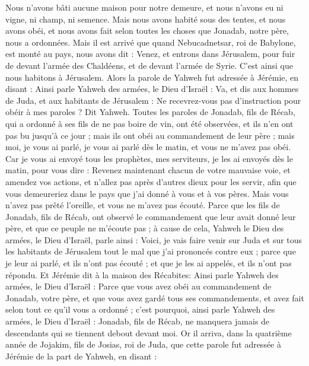 \begin{multicols}{2}
Nous n'avons bâti aucune maison pour notre demeure, et nous n'avons eu ni vigne, ni champ, ni semence.
Mais nous avons habité sous des tentes, et nous avons obéi, et nous avons fait selon toutes les choses que Jonadab, notre père, nous a ordonnées.
Mais il est arrivé que quand Nebucadnetsar, roi de Babylone, est monté au pays, nous avons dit : Venez, et entrons dans Jérusalem, pour fuir de devant l'armée des Chaldéens, et de devant l'armée de Syrie. C'est ainsi que nous habitons à Jérusalem.
Alors la parole de Yahweh fut adressée à Jérémie, en disant :
Ainsi parle Yahweh des armées, le Dieu d'Israël : Va, et dis aux hommes de Juda, et aux habitants de Jérusalem : Ne recevrez-vous pas d'instruction pour obéir à mes paroles ? Dit Yahweh.
Toutes les paroles de Jonadab, fils de Récab, qui a ordonné à ses fils de ne pas boire de vin, ont été observées, et ils n'en ont pas bu jusqu'à ce jour ; mais ils ont obéi au commandement de leur père ; mais moi, je vous ai parlé, je vous ai parlé dès le matin, et vous ne m'avez pas obéi.
Car je vous ai envoyé tous les prophètes, mes serviteurs, je les ai envoyés dès le matin, pour vous dire : Revenez maintenant chacun de votre mauvaise voie, et amendez vos actions, et n'allez pas après d'autres dieux pour les servir, afin que vous demeureriez dans le pays que j'ai donné à vous et à vos pères. Mais vous n'avez pas prêté l'oreille, et vous ne m'avez pas écouté.
Parce que les fils de Jonadab, fils de Récab, ont observé le commandement que leur avait donné leur père, et que ce peuple ne m'écoute pas ;
à cause de cela, Yahweh le Dieu des armées, le Dieu d'Israël, parle ainsi : Voici, je vais faire venir sur Juda et sur tous les habitants de Jérusalem tout le mal que j'ai prononcés contre eux ; parce que je leur ai parlé, et ils n'ont pas écouté ; et que je les ai appelés, et ils n'ont pas répondu.
Et Jérémie dit à la maison des Récabites: Ainsi parle Yahweh des armées, le Dieu d'Israël : Parce que vous avez obéi au commandement de Jonadab, votre père, et que vous avez gardé tous ses commandements, et avez fait selon tout ce qu'il vous a ordonné ;
c'est pourquoi, ainsi parle Yahweh des armées, le Dieu d'Israël : Jonadab, fils de Récab, ne manquera jamais de descendants qui se tiennent debout devant moi.
\VerseOne{}Or il arriva, dans la quatrième année de Jojakim, fils de Josias, roi de Juda, que cette parole fut adressée à Jérémie de la part de Yahweh, en disant :

\end{multicols}
